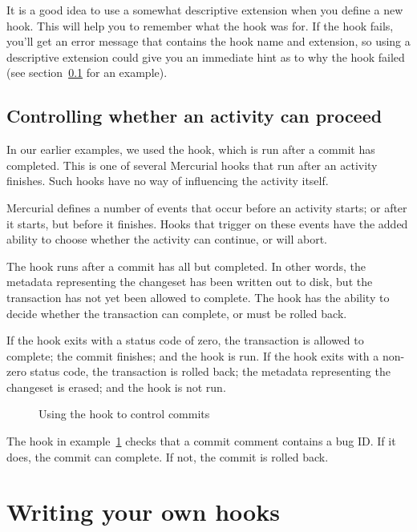 It is a good idea to use a somewhat descriptive extension when you
define a new hook.  This will help you to remember what the hook was
for.  If the hook fails, you'll get an error message that contains the
hook name and extension, so using a descriptive extension could give
you an immediate hint as to why the hook failed (see
section~\ref{sec:hook:perm} for an example).

\subsection{Controlling whether an activity can proceed}
\label{sec:hook:perm}

In our earlier examples, we used the  hook, which is
run after a commit has completed.  This is one of several Mercurial
hooks that run after an activity finishes.  Such hooks have no way of
influencing the activity itself.

Mercurial defines a number of events that occur before an activity
starts; or after it starts, but before it finishes.  Hooks that
trigger on these events have the added ability to choose whether the
activity can continue, or will abort.  

The  hook runs after a commit has all but
completed.  In other words, the metadata representing the changeset
has been written out to disk, but the transaction has not yet been
allowed to complete.  The  hook has the ability to
decide whether the transaction can complete, or must be rolled back.

If the  hook exits with a status code of zero, the
transaction is allowed to complete; the commit finishes; and the
 hook is run.  If the  hook exits with
a non-zero status code, the transaction is rolled back; the metadata
representing the changeset is erased; and the  hook is
not run.

\begin{figure}[ht]
  \caption{Using the  hook to control commits}
  \label{ex:hook:pretxncommit}
\end{figure}

The hook in example~\ref{ex:hook:pretxncommit} checks that a commit
comment contains a bug ID.  If it does, the commit can complete.  If
not, the commit is rolled back.

\section{Writing your own hooks}

